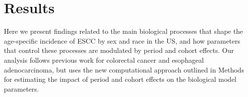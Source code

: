 \documentclass[10pt,letterpaper]{article}
\begin{document}

\section*{Results}
Here we present findings related to the main biological processes that shape the age-specific incidence of ESCC by sex and race in the US, and how parameters that control these processes are modulated by period and cohort effects. Our analysis follows previous work for colorectal cancer and esophageal adenocarcinoma, but uses the new computational approach outlined in Methods for estimating the impact of period and cohort effects on the biological model parameters.
\end{document}
